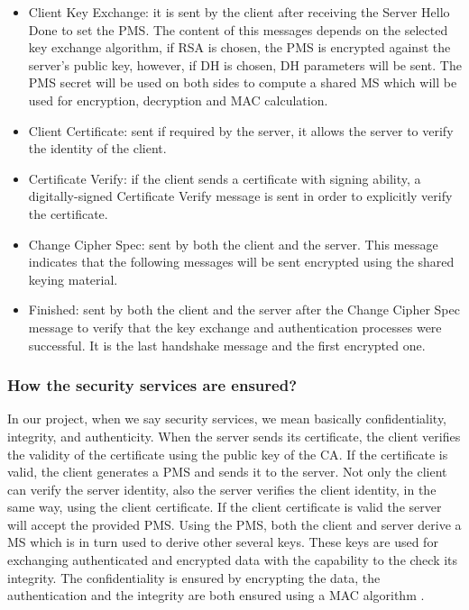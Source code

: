 \begin{itemize}
  \item Client Key Exchange: it is sent by the client after receiving the Server Hello Done to set the \ac{PMS}. The content of this messages depends on the selected key exchange algorithm, if RSA is chosen,
  the PMS is encrypted against the server's public key, however, if \ac{DH} is chosen, DH parameters will be sent. The PMS secret will be used on both sides to compute a shared \ac{MS} which will be used for encryption, decryption and MAC calculation.

  \item Client Certificate: sent if required by the server, it allows the server to verify the identity of the client.

  \item Certificate Verify: if the client sends a certificate with signing ability, a digitally-signed Certificate Verify message is sent in order to explicitly verify the certificate.

  \item Change Cipher Spec: sent by both the client and the server. This message indicates that the following messages
  will be sent encrypted using the shared keying material.

  \item Finished: sent by both the client and the server after the Change Cipher Spec message to verify that the key exchange and authentication processes were successful. It is the last handshake message and the first encrypted one.

\end{itemize}


\subsubsection{How the security services are ensured?}

In our project, when we say security services, we mean basically confidentiality, integrity, and authenticity.
When the server sends its certificate, the client verifies the validity of the certificate using the public key of the
\ac{CA}. If the certificate is valid, the client generates a PMS and sends it to the server.
Not only the client can verify the server identity, also the server verifies the client identity, in the same way, using
the client certificate. If the client certificate is valid the server will accept the provided PMS.
Using the PMS, both the client and server derive a MS which is in turn used to derive other several keys.
These keys are used for exchanging authenticated and encrypted data with the capability to the check its integrity.
The confidentiality is ensured by encrypting the data, the authentication and the integrity are both ensured using a MAC algorithm \cite{rfc5246}.


